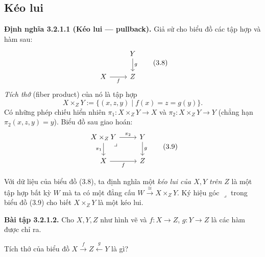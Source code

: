 \subsection{Kéo lui}
\noindent\textbf{Định nghĩa 3.2.1.1 (Kéo lui --- pullback).} Giả sử cho biểu đồ các tập hợp và hàm sau:
\begin{equation*}\begin{tikzcd}&Y\arrow[d,"g"]\\X\arrow[r,"f"']&Z\end{tikzcd}\tag{3.8}\end{equation*}
\emph{Tích thớ} (fiber product) của nó là tập hợp
\[X\times_ZY:=\{(x,z,y)\mid f(x)=z=g(y)\}.\]
Có những phép chiếu hiển nhiên $\pi_1:X\times_ZY\to X$ và $\pi_2:X\times_ZY\to Y$ (chẳng hạn $\pi_2(x,z,y)=y$). Biểu đồ sau giao hoán:
\begin{equation*}\begin{tikzcd}
X\times_ZY\arrow[r,"\pi_2"]\arrow[d,"\pi_1"']\arrow[dr,phantom,"\lrcorner",very near start]&Y\arrow[d,"g"]\\X\arrow[r,"f"']&Z
\end{tikzcd}\tag{3.9}\end{equation*}

Với dữ liệu của biểu đồ (3.8), ta định nghĩa một \emph{kéo lui của $X,Y$ trên $Z$} là một tập hợp bất kỳ $W$ mà ta có một đẳng cấu $W\xrightarrow{\cong}X\times_ZY$. Ký hiệu góc $\lrcorner$ trong biểu đồ (3.9) cho biết $X\times_ZY$ là một kéo lui.

\noindent\textbf{Bài tập 3.2.1.2.} Cho $X,Y,Z$ như hình vẽ và $f:X\to Z$, $g:Y\to Z$ là các hàm được chỉ ra.
\begin{center}\end{center}
Tích thớ của biểu đồ $X\xrightarrow{f}Z\xleftarrow{g}Y$ là gì?

